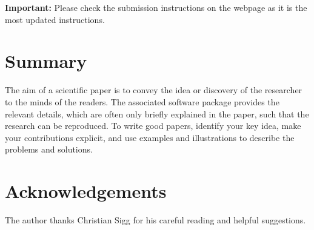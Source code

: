 \documentclass[10pt,conference,compsocconf]{IEEEtran}
\begin{document}
\textbf{Important:} Please check the submission instructions on the webpage 
as it is the most updated instructions. 

\section{Summary}

The aim of a scientific paper is to convey the idea or discovery of
the researcher to the minds of the readers. The associated software
package provides the relevant details, which are often only briefly
explained in the paper, such that the research can be reproduced.
To write good papers, identify your key idea, make your contributions
explicit, and use examples and illustrations to describe the problems
and solutions.

\section*{Acknowledgements}
The author thanks Christian Sigg for his careful reading and helpful
suggestions.



\end{document}
